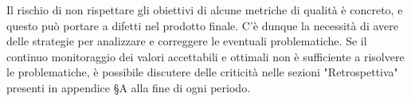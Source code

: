 
Il rischio di non rispettare gli obiettivi di alcune metriche di qualità è concreto, e questo
può portare a difetti nel prodotto finale. C'è dunque la necessità di avere delle strategie per 
analizzare e correggere le eventuali problematiche. Se il continuo monitoraggio dei valori
accettabili e ottimali non è sufficiente a risolvere le problematiche, è possibile discutere delle criticità
nelle sezioni "Retrospettiva" presenti in appendice §A alla fine di ogni periodo.